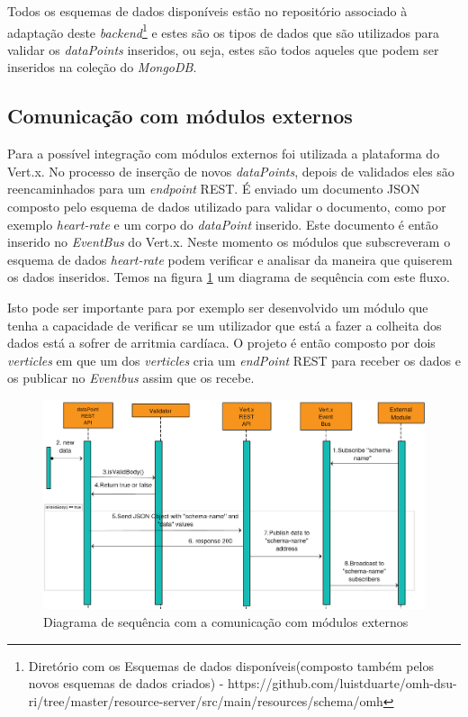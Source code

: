 Todos os esquemas de dados disponíveis estão no repositório associado à adaptação deste \textit{backend}\footnote{ Diretório com os Esquemas de dados disponíveis(composto também pelos novos esquemas de dados criados) - https://github.com/luistduarte/omh-dsu-ri/tree/master/resource-server/src/main/resources/schema/omh} e estes são os tipos de dados que são utilizados para validar os  \textit{dataPoints} inseridos, ou seja, estes são todos aqueles que podem ser inseridos na coleção do  \textit{MongoDB}.

\subsection{Comunicação com módulos externos}
Para a possível integração com módulos externos foi utilizada a plataforma do Vert.x. No processo de inserção de novos \textit{dataPoints}, depois de validados eles são reencaminhados para um \textit{endpoint} \gls{REST}. É enviado um documento \gls{JSON} composto pelo esquema de dados utilizado para validar o documento, como por exemplo \textit{heart-rate} e um corpo do \textit{dataPoint} inserido. Este documento é então inserido no \textit{EventBus} do Vert.x. Neste momento os módulos que subscreveram o esquema de dados \textit{heart-rate} podem verificar e analisar da maneira que quiserem os dados inseridos. Temos na figura \ref{f:toExtSeqDiagram} um diagrama de sequência com este fluxo. \par
Isto pode ser importante para por exemplo ser desenvolvido um módulo que tenha a capacidade de verificar se um utilizador que está a fazer a colheita dos dados está a sofrer de arritmia cardíaca.
O projeto é então composto por dois \textit{verticles} em que um dos \textit{verticles} cria um \textit{endPoint} \gls{REST} para receber os dados e os publicar no \textit{Eventbus} assim que os recebe.

\begin{figure}[H]
  \centering
  \includegraphics[width=1\textwidth]{imgs/toExtSeqDiagram.png}
  \caption[Diagrama de sequência com a comunicação com módulos externos]{Diagrama de sequência com a comunicação com módulos externos}
  
  \label{f:toExtSeqDiagram}
\end{figure}

